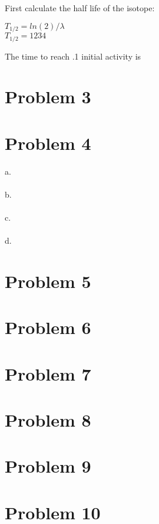 \documentclass[letter]{article}
\begin{document}
First calculate the half life of the isotope:
\begin{center}
$T_{1/2}=ln(2)/\lambda$\\
$T_{1/2}=1234$
\end{center}
The time to reach .1 initial activity is 

\section{Problem 3}

\section{Problem 4}
a. \\
\\
b. \\
\\
c. \\
\\
d. \\
\section{Problem 5}

\section{Problem 6}

\section{Problem 7}

\section{Problem 8}

\section{Problem 9}

\section{Problem 10}





\end{document}
